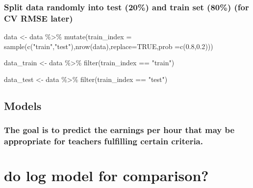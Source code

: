 \documentclass[
]{article}
\newenvironment{Shaded}{\begin{snugshade}}{\end{snugshade}}
\newcommand{\AttributeTok}[1]{\textcolor[rgb]{0.77,0.63,0.00}{#1}}
\newcommand{\ConstantTok}[1]{\textcolor[rgb]{0.00,0.00,0.00}{#1}}
\newcommand{\FloatTok}[1]{\textcolor[rgb]{0.00,0.00,0.81}{#1}}
\newcommand{\FunctionTok}[1]{\textcolor[rgb]{0.00,0.00,0.00}{#1}}
\newcommand{\NormalTok}[1]{#1}
\newcommand{\OtherTok}[1]{\textcolor[rgb]{0.56,0.35,0.01}{#1}}
\newcommand{\SpecialCharTok}[1]{\textcolor[rgb]{0.00,0.00,0.00}{#1}}
\newcommand{\StringTok}[1]{\textcolor[rgb]{0.31,0.60,0.02}{#1}}
\begin{document}
\hypertarget{split-data-randomly-into-test-20-and-train-set-80-for-cv-rmse-later}{%
\subsubsection{Split data randomly into test (20\%) and train set (80\%)
(for CV RMSE
later)}\label{split-data-randomly-into-test-20-and-train-set-80-for-cv-rmse-later}}

\begin{Shaded}
\begin{Highlighting}[]
\NormalTok{data }\OtherTok{\textless{}{-}}\NormalTok{ data }\SpecialCharTok{\%\textgreater{}\%} \FunctionTok{mutate}\NormalTok{(}\AttributeTok{train\_index =} \FunctionTok{sample}\NormalTok{(}\FunctionTok{c}\NormalTok{(}\StringTok{"train"}\NormalTok{,}\StringTok{"test"}\NormalTok{),}\FunctionTok{nrow}\NormalTok{(data),}\AttributeTok{replace=}\ConstantTok{TRUE}\NormalTok{,}\AttributeTok{prob =}\FunctionTok{c}\NormalTok{(}\FloatTok{0.8}\NormalTok{,}\FloatTok{0.2}\NormalTok{)))}

\NormalTok{data\_train }\OtherTok{\textless{}{-}}\NormalTok{ data }\SpecialCharTok{\%\textgreater{}\%} \FunctionTok{filter}\NormalTok{(train\_index }\SpecialCharTok{==} \StringTok{"train"}\NormalTok{)}
  
\NormalTok{data\_test }\OtherTok{\textless{}{-}}\NormalTok{ data }\SpecialCharTok{\%\textgreater{}\%} \FunctionTok{filter}\NormalTok{(train\_index }\SpecialCharTok{==} \StringTok{"test"}\NormalTok{)}
\end{Highlighting}
\end{Shaded}

\hypertarget{models}{%
\subsection{Models}\label{models}}

\hypertarget{the-goal-is-to-predict-the-earnings-per-hour-that-may-be-appropriate-for-teachers-fulfilling-certain-criteria.}{%
\subsubsection{The goal is to predict the earnings per hour that may be
appropriate for teachers fulfilling certain
criteria.}\label{the-goal-is-to-predict-the-earnings-per-hour-that-may-be-appropriate-for-teachers-fulfilling-certain-criteria.}}

\hypertarget{do-log-model-for-comparison}{%
\section{do log model for
comparison?}\label{do-log-model-for-comparison}}
\end{document}
